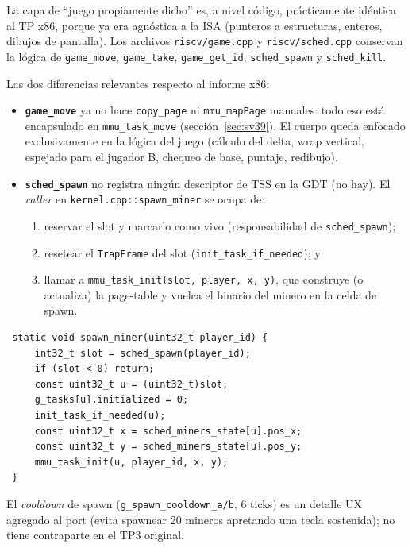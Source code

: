 La capa de ``juego propiamente dicho'' es, a nivel código, prácticamente idéntica al TP x86, porque ya era agnóstica a
la ISA (punteros a estructuras, enteros, dibujos de pantalla). Los archivos \texttt{riscv/game.cpp} y
\texttt{riscv/sched.cpp} conservan la lógica de \texttt{game\_move}, \texttt{game\_take}, \texttt{game\_get\_id},
\texttt{sched\_spawn} y \texttt{sched\_kill}.

Las dos diferencias relevantes respecto al informe x86:

\begin{itemize}
  \item \textbf{\texttt{game\_move}} ya no hace \texttt{copy\_page} ni \texttt{mmu\_mapPage} manuales: todo eso está
  encapsulado en \texttt{mmu\_task\_move} (sección~\ref{sec:sv39}). El cuerpo queda enfocado exclusivamente en la lógica
  del juego (cálculo del delta, wrap vertical, espejado para el jugador B, chequeo de base, puntaje, redibujo).

  \item \textbf{\texttt{sched\_spawn}} no registra ningún descriptor de TSS en la GDT (no hay). El \emph{caller} en
  \texttt{kernel.cpp::spawn\_miner} se ocupa de:
  \begin{enumerate}
    \item reservar el slot y marcarlo como vivo (responsabilidad de \texttt{sched\_spawn});
    \item resetear el \texttt{TrapFrame} del slot (\texttt{init\_task\_if\_needed}); y
    \item llamar a \texttt{mmu\_task\_init(slot, player, x, y)}, que construye (o actualiza) la page-table y vuelca el
    binario del minero en la celda de spawn.
  \end{enumerate}
\end{itemize}

\begin{codesnippet}
\begin{verbatim}
 static void spawn_miner(uint32_t player_id) {
     int32_t slot = sched_spawn(player_id);
     if (slot < 0) return;
     const uint32_t u = (uint32_t)slot;
     g_tasks[u].initialized = 0;
     init_task_if_needed(u);
     const uint32_t x = sched_miners_state[u].pos_x;
     const uint32_t y = sched_miners_state[u].pos_y;
     mmu_task_init(u, player_id, x, y);
 }
\end{verbatim}
\end{codesnippet}

El \emph{cooldown} de spawn (\texttt{g\_spawn\_cooldown\_a/b}, 6 ticks) es un detalle UX agregado al port (evita
spawnear 20 mineros apretando una tecla sostenida); no tiene contraparte en el TP3 original.

